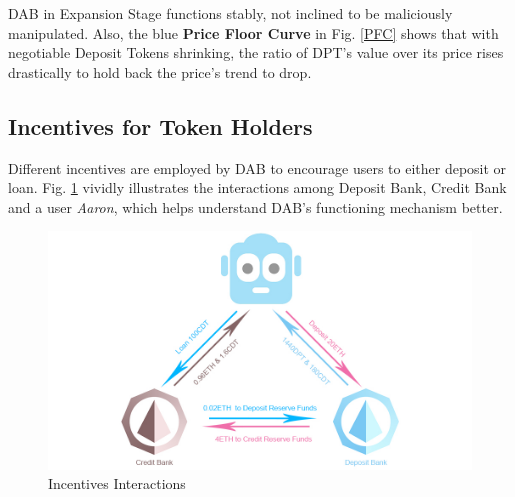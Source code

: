 \documentclass[review]{elsarticle}
\begin{document}
DAB in Expansion Stage functions stably, not inclined to be maliciously manipulated. Also, the blue \textbf{Price Floor Curve} in Fig. \ref{PFC} shows that with negotiable Deposit Tokens shrinking, the ratio of DPT's value over its price rises drastically to hold back the price's trend to drop.

\subsection{Incentives for Token Holders}
Different incentives are employed by DAB to encourage users to either deposit or loan. Fig. \ref{II} vividly illustrates the interactions among Deposit Bank, Credit Bank and a user \emph{Aaron}, which helps understand DAB's functioning mechanism better.

\begin{figure}[H]
\begin{center}
\includegraphics[width=4.5in]{Graphs/InterestDistribution.jpg}
\end{center}
\caption{Incentives Interactions}\label{II}
\end{figure}
\end{document}
